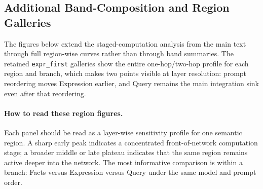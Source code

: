 \subsection{Additional Band-Composition and Region Galleries}
\label{sec:appendix_extra_region_gallery}

\captionsetup[figure]{font=small}
\captionsetup[subfigure]{font=small}

The figures below extend the staged-computation analysis from the main text through full region-wise curves rather than through band summaries. The retained \texttt{expr\_first} galleries show the entire one-hop/two-hop profile for each region and branch, which makes two points visible at layer resolution: prompt reordering moves Expression earlier, and Query remains the main integration sink even after that reordering.

\paragraph{How to read these region figures.}
Each panel should be read as a layer-wise sensitivity profile for one semantic region. A sharp early peak indicates a concentrated front-of-network computation stage; a broader middle or late plateau indicates that the same region remains active deeper into the network. The most informative comparison is within a branch: Facts versus Expression versus Query under the same model and prompt order.


